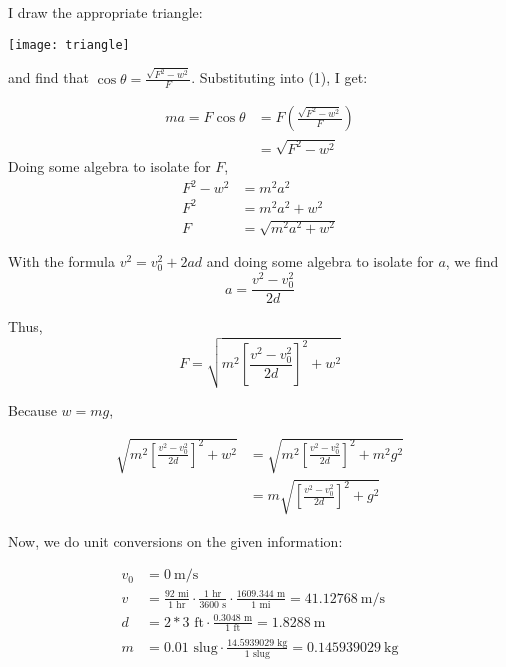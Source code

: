 \documentclass[11pt]{article}
\begin{document}
I draw the appropriate triangle:

\texttt{[image: triangle]}

and find that $\cos\theta = \frac{\sqrt{F^2-w^2}}{F}$. Substituting into (1), I get:

\begin{align*}
      ma = F\cos\theta & = F\left(\frac{\sqrt{F^2-w^2}}{F}\right) \\
                       & = \sqrt{F^2 - w^2}
\end{align*}
Doing some algebra to isolate for $F$,
\begin{align*}
      F^2 - w^2 & = m^2a^2              \\
      F^2       & = m^2a^2 + w^2        \\
      F         & = \sqrt{m^2a^2 + w^2}
\end{align*}

With the formula $v^2 = v_0^2 + 2ad$ and doing some algebra to isolate for $a$, we find
\[a = \frac{v^2 - v_0^2}{2d}\]

Thus,
\[F         = \sqrt{m^2\left[\frac{v^2 - v_0^2}{2d}\right]^2 + w^2} \]

Because $w = mg$,

\begin{align*}
      \sqrt{m^2\left[\frac{v^2 - v_0^2}{2d}\right]^2 + w^2} & = \sqrt{m^2\left[\frac{v^2 - v_0^2}{2d}\right]^2 + m^2g^2} \\
                                                            & = m \sqrt{\left[\frac{v^2 - v_0^2}{2d}\right]^2 + g^2}
\end{align*}

Now, we do unit conversions on the given information:

\begin{align*}
      v_0 & = \SI{0}{\meter\per\second}                                                                          \\
      v   & = \frac{92 \text{ mi}}{1 \text{ hr}} \cdot \frac{1 \text{ hr}}{3600 \text{ s}} \cdot
      \frac{1609.344 \text{ m}}{1 \text{ mi}} = \SI{41.12768}{\meter\per\second}                                 \\
      d   & = 2 \ast 3 \text{ ft} \cdot \frac{0.3048 \text{ m}}{1 \text{ ft}} = \SI{1.8288}{\meter}              \\
      m   & = 0.01 \text{ slug} \cdot \frac{14.5939029 \text{ kg}}{1 \text{ slug}} = \SI{0.145939029}{\kilogram}
\end{align*}
\end{document}
